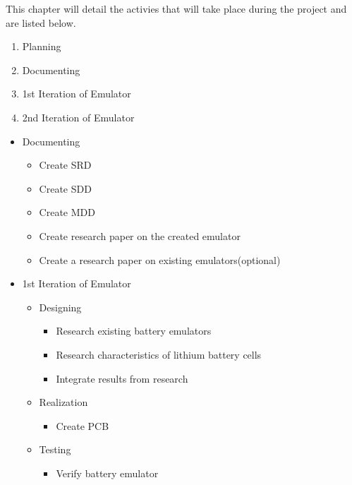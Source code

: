 This chapter will detail the activies that will take place during the project and are listed below. 

\begin{enumerate}
    \item Planning 
    \item Documenting
    \item 1st Iteration of Emulator
    \item 2nd Iteration of Emulator
\end{enumerate}


\begin{itemize}
    \item Documenting
    \begin{itemize}
    \item Create SRD
    \item Create SDD
    \item Create MDD
    \item Create research paper on the created emulator 
    \item Create a research paper on existing emulators(optional)
    \end{itemize}

    \item 1st Iteration of Emulator
    \begin{itemize}
        \item Designing
        \begin{itemize}
            \item Research existing battery emulators 
            \item Research characteristics of lithium battery cells 
            \item Integrate results from research
        \end{itemize}
        \item Realization
        \begin{itemize}
            \item Create PCB
        \end{itemize}
        \item Testing
        \begin{itemize}
            \item Verify battery emulator
        \end{itemize}
    \end{itemize}


\end{itemize}

